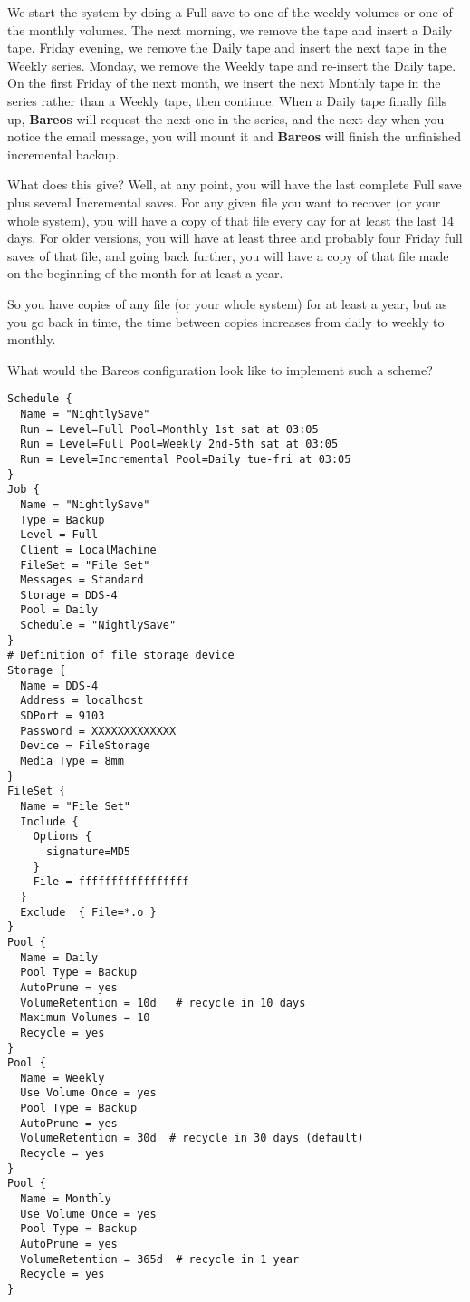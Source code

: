 We start the system by doing a Full save to one of the weekly volumes or one
of the monthly volumes. The next morning, we remove the tape and insert a
Daily tape. Friday evening, we remove the Daily tape and insert the next tape
in the Weekly series. Monday, we remove the Weekly tape and re-insert the
Daily tape. On the first Friday of the next month, we insert the next Monthly
tape in the series rather than a Weekly tape, then continue. When a Daily tape
finally fills up, {\bf Bareos} will request the next one in the series, and
the next day when you notice the email message, you will mount it and {\bf
Bareos} will finish the unfinished incremental backup.

What does this give? Well, at any point, you will have the last complete
Full save plus several Incremental saves. For any given file you want to
recover (or your whole system), you will have a copy of that file every day
for at least the last 14 days. For older versions, you will have at least three
and probably four Friday full saves of that file, and going back further, you
will have a copy of that file made on the beginning of the month for at least
a year.

So you have copies of any file (or your whole system) for at least a year, but
as you go back in time, the time between copies increases from daily to weekly
to monthly.

What would the Bareos configuration look like to implement such a scheme?

\footnotesize
\begin{verbatim}
Schedule {
  Name = "NightlySave"
  Run = Level=Full Pool=Monthly 1st sat at 03:05
  Run = Level=Full Pool=Weekly 2nd-5th sat at 03:05
  Run = Level=Incremental Pool=Daily tue-fri at 03:05
}
Job {
  Name = "NightlySave"
  Type = Backup
  Level = Full
  Client = LocalMachine
  FileSet = "File Set"
  Messages = Standard
  Storage = DDS-4
  Pool = Daily
  Schedule = "NightlySave"
}
# Definition of file storage device
Storage {
  Name = DDS-4
  Address = localhost
  SDPort = 9103
  Password = XXXXXXXXXXXXX
  Device = FileStorage
  Media Type = 8mm
}
FileSet {
  Name = "File Set"
  Include {
    Options {
      signature=MD5
    }
    File = fffffffffffffffff
  }
  Exclude  { File=*.o }
}
Pool {
  Name = Daily
  Pool Type = Backup
  AutoPrune = yes
  VolumeRetention = 10d   # recycle in 10 days
  Maximum Volumes = 10
  Recycle = yes
}
Pool {
  Name = Weekly
  Use Volume Once = yes
  Pool Type = Backup
  AutoPrune = yes
  VolumeRetention = 30d  # recycle in 30 days (default)
  Recycle = yes
}
Pool {
  Name = Monthly
  Use Volume Once = yes
  Pool Type = Backup
  AutoPrune = yes
  VolumeRetention = 365d  # recycle in 1 year
  Recycle = yes
}
\end{verbatim}
\normalsize

